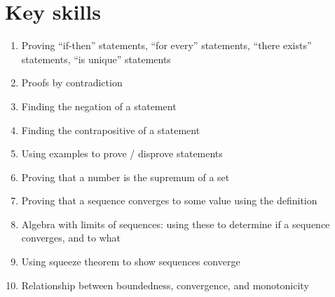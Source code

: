 \documentclass[12pt]{amsart}
\newcommand{\e}{\varepsilon}
\renewcommand{\d}{\delta}
\begin{document}
\section*{Key skills}

\begin{enumerate}
	\item Proving ``if-then'' statements, ``for every'' statements, ``there exists'' statements, ``is unique'' statements
	\item Proofs by contradiction
	\item Finding the negation of a statement
	\item Finding the contrapositive of a statement
	\item Using examples to prove / disprove statements
		
	\item Proving that a number is the supremum of a set

	\item Proving that a sequence converges to some value using the definition

		\item Algebra with limits of sequences: using these to determine if a sequence converges, and to what

	\item Using squeeze theorem to show sequences converge


	\item Relationship between boundedness, convergence, and monotonicity
		\begin{comment}
					\item Proofs by induction
	

	\item Relationship between convergence/boundedness of sequences and convergence of subsequences


	\item Using the $\e-\d$ definition to compute limits
					
	\item Using algebra/squeeze theorem to compute limits
	
	\item Using the $\e-\d$ definition to show continuity

	\item Using algebra/compositions to show continuity
	\item Applying the $\e-\d$ definitions of limits and continuity
					\item Applying the Intermediate Value Theorem
		\item Applying Boundedness and Extreme Value Theorems
		


\end{comment}
\end{enumerate}
\end{document}
